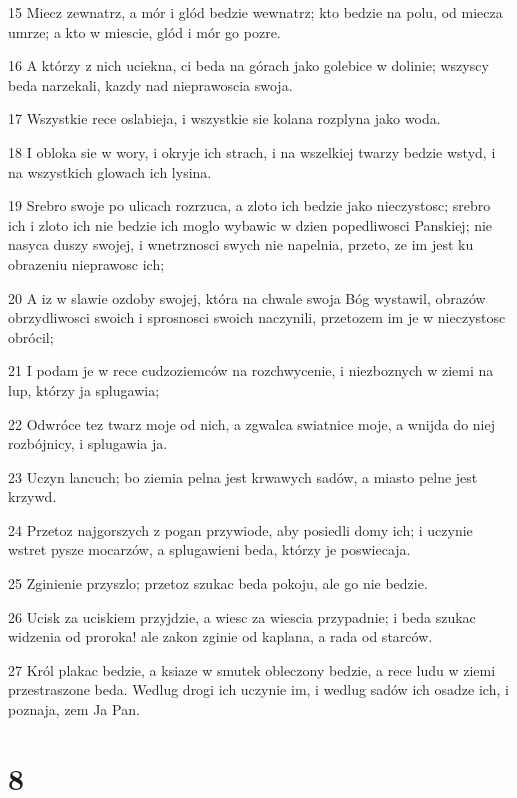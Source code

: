 \par 15 Miecz zewnatrz, a mór i glód bedzie wewnatrz; kto bedzie na polu, od miecza umrze; a kto w miescie, glód i mór go pozre.
\par 16 A którzy z nich uciekna, ci beda na górach jako golebice w dolinie; wszyscy beda narzekali, kazdy nad nieprawoscia swoja.
\par 17 Wszystkie rece oslabieja, i wszystkie sie kolana rozplyna jako woda.
\par 18 I obloka sie w wory, i okryje ich strach, i na wszelkiej twarzy bedzie wstyd, i na wszystkich glowach ich lysina.
\par 19 Srebro swoje po ulicach rozrzuca, a zloto ich bedzie jako nieczystosc; srebro ich i zloto ich nie bedzie ich moglo wybawic w dzien popedliwosci Panskiej; nie nasyca duszy swojej, i wnetrznosci swych nie napelnia, przeto, ze im jest ku obrazeniu nieprawosc ich;
\par 20 A iz w slawie ozdoby swojej, która na chwale swoja Bóg wystawil, obrazów obrzydliwosci swoich i sprosnosci swoich naczynili, przetozem im je w nieczystosc obrócil;
\par 21 I podam je w rece cudzoziemców na rozchwycenie, i niezboznych w ziemi na lup, którzy ja splugawia;
\par 22 Odwróce tez twarz moje od nich, a zgwalca swiatnice moje, a wnijda do niej rozbójnicy, i splugawia ja.
\par 23 Uczyn lancuch; bo ziemia pelna jest krwawych sadów, a miasto pelne jest krzywd.
\par 24 Przetoz najgorszych z pogan przywiode, aby posiedli domy ich; i uczynie wstret pysze mocarzów, a splugawieni beda, którzy je poswiecaja.
\par 25 Zginienie przyszlo; przetoz szukac beda pokoju, ale go nie bedzie.
\par 26 Ucisk za uciskiem przyjdzie, a wiesc za wiescia przypadnie; i beda szukac widzenia od proroka! ale zakon zginie od kaplana, a rada od starców.
\par 27 Król plakac bedzie, a ksiaze w smutek obleczony bedzie, a rece ludu w ziemi przestraszone beda. Wedlug drogi ich uczynie im, i wedlug sadów ich osadze ich, i poznaja, zem Ja Pan.

\chapter{8}

